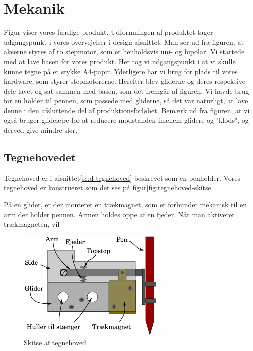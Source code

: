 \chapter[Implementering af mekanik]{Mekanik}


Figur  viser vores færdige
produkt.  Udformningen af produktet tager udgangspunkt i vores
overvejelser i design-afsnittet.  Man ser ud fra figuren, at akserne
styres af to stepmotor, som er henholdsvis uni- og bipolar.  Vi
startede med at lave basen for vores produkt. Her tog vi udgangspunkt
i at vi skulle kunne tegne på et stykke A4-papir. Yderligere har vi
brug for plads til vores hardware, som styrer stepmotorerne. Herefter
blev gliderne og deres respektive dele lavet og sat sammen med basen,
som det fremgår af figuren. Vi havde brug for en holder til pennen,
som passede med gliderne, så det var naturligt, at lave denne i den
afsluttende del af produktionsforløbet. Bemærk ud fra figuren, at vi
også bruger glidelejre for at reducere modstanden imellem glidere og
"klods", og derved give mindre slør.

\section{Tegnehovedet}
Tegnehoved er i afsnittet\vref{sc:d-tegnehoved} beskrevet som en
penholder. Vores tegnehoved er konstrueret som det ses på
figur\vref{fig:tegnehoved-skitse}.

På en glider, er der monteret en trækmagnet, som er forbundet mekanisk
til en arm der holder pennen. Armen holdes oppe af en fjeder. Når man
aktiverer trækmagneten, vil

\begin{figure}[htbp]
  \centering
  \includegraphics[width=7cm]{./img/tegnehoved-skitse}
  \caption{Skitse af tegnehoved}
  \label{fig:tegnehoved-skitse}
\end{figure}

